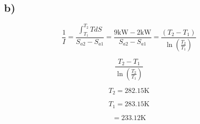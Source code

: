

\subsection*{b)}

\[
\frac{1}{I} = \frac{\int_{T_1}^{T_2} T dS}{S_{a2} - S_{a1}} = \frac{9 \text{kW} - 2 \text{kW}}{S_{a2} - S_{a1}} = \frac{(T_2 - T_1)}{\ln \left( \frac{T_2}{T_1} \right)}
\]

\[
\frac{T_2 - T_1}{\ln \left( \frac{T_2}{T_1} \right)}
\]

\[
T_2 = 282.15 \text{K}
\]

\[
T_1 = 283.15 \text{K}
\]

\[
= 233.12 \text{K}
\]